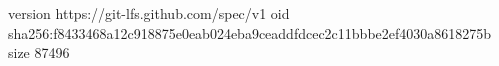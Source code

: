 version https://git-lfs.github.com/spec/v1
oid sha256:f8433468a12c918875e0eab024eba9ceaddfdcec2c11bbbe2ef4030a8618275b
size 87496
